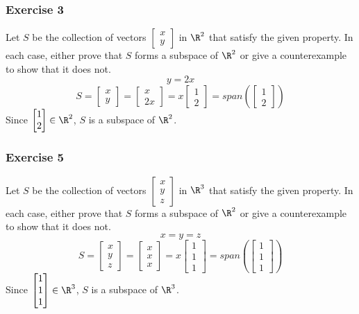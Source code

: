 \documentclass{math}
\begin{document}
\subsubsection*{Exercise 3}
Let \( S \) be the collection of vectors \( \begin{bmatrix}x \\ y\end{bmatrix}
\) in \( \R^2 \) that satisfy the given property. In each case, either prove
that \( S \) forms a subspace of \( \R^2 \) or give a counterexample to show
that it does not.
\[ y = 2x \]
\[ S = \begin{bmatrix}x \\ y\end{bmatrix} =
  \begin{bmatrix}x \\ 2x\end{bmatrix} =
  x\begin{bmatrix}1 \\ 2\end{bmatrix} =
  span\left(\begin{bmatrix}1 \\ 2\end{bmatrix}\right) \]
Since \( \begin{bmatrix}1 \\ 2\end{bmatrix}\in\R^2 \), \( S \) is a subspace of
\( \R^2 \).

\subsubsection*{Exercise 5}
Let \( S \) be the collection of vectors \( \begin{bmatrix}x \\ y \\ z
\end{bmatrix} \) in \( \R^3 \) that satisfy the given property. In each case,
either prove that \( S \) forms a subspace of \( \R^2 \) or give a
counterexample to show that it does not.
\[ x = y = z \]
\[ S = \begin{bmatrix}x \\ y \\ z\end{bmatrix} =
  \begin{bmatrix}x \\ x \\ x\end{bmatrix} =
  x\begin{bmatrix}1 \\ 1 \\ 1\end{bmatrix} =
  span\left(\begin{bmatrix}1 \\ 1 \\ 1\end{bmatrix}\right) \]
Since \( \begin{bmatrix}1 \\ 1 \\ 1\end{bmatrix}\in\R^3 \), \( S \) is a
subspace of \( \R^3 \).
\end{document}
